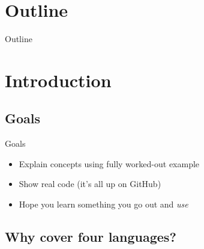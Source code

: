 \section*{Outline}

\begin{frame}{Outline}
  \tableofcontents[subsectionstyle=hide]
\end{frame}

\section{Introduction}

\subsection{Goals}

\begin{frame}{Goals}
  \begin{itemize}
  \item Explain concepts using fully worked-out example
  \item Show real code (it's all up on GitHub)
  \item Hope you learn something you go out and \emph{use}
  \end{itemize}
\end{frame}

\subsection{Why cover four languages?}

